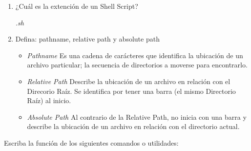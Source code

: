 \begin{enumerate}
			\item ¿Cuál es la extención de un Shell Script?
			
			\textit{.sh}
			
			\item Defina: pathname, relative path y absolute path
			
			\begin{itemize}
			\item \textit{Pathname} \newline
				Es una cadena de carácteres que identifica la ubicación de un archivo particular; la secuencia de directorios a moverse para encontrarlo.
			\item \textit{Relative Path} \newline
				Describe la ubicación de un archivo en relación con el Direcorio Raíz. Se identifica por tener una barra (el mismo Directorio Raíz) al inicio.
			\item \textit{Absolute Path} \newline
				Al contrario de la Relative Path, no inicia con una barra y describe la ubicación de un archivo en relación con el directorio actual.
			\end{itemize}
			
		\end{enumerate}

	Escriba la funci\'on de los siguientes comandos o utilidades: 
			
